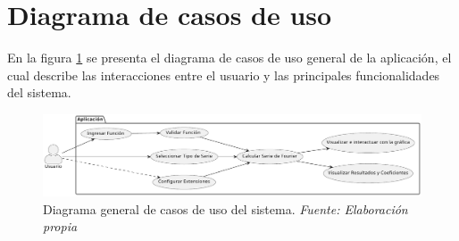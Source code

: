 \section{Diagrama de casos de uso}
En la figura \ref{fig:Diagrama_casos_de_uso} se presenta el diagrama de casos de uso general de la aplicación, el cual describe las interacciones entre el usuario y las principales funcionalidades del sistema. 
\begin{figure}[H]
	\centering
	\includegraphics[width=1\textwidth]{img/chapter04/DCU.pdf}
	\caption[Diagrama general de casos de uso del sistema.]{Diagrama general de casos de uso del sistema. \textit{Fuente: \textit{Elaboración propia}}}
	\label{fig:Diagrama_casos_de_uso}
\end{figure}


